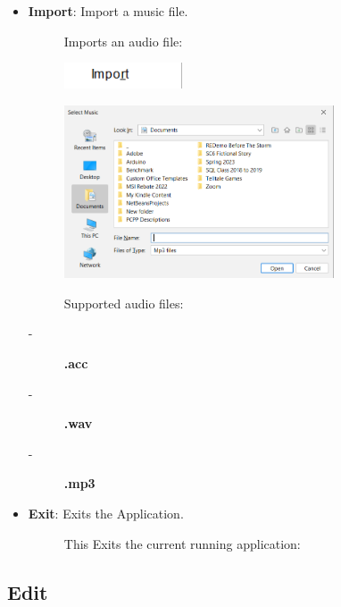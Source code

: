\documentclass{article}
\begin{document}
\begin{itemize}
    \clearpage
    
    \item \textbf{Import}: Import a music file.
    \begin{description}
        \item[] Imports an audio file:
        \item[] \includegraphics[width=3.5cm]{Images/File Import.png}
        \item[] \includegraphics[width=8cm]{Images/musicFileSearch.png}
        \item[]Supported audio files: 
        \item[-]\textbf{.acc}
        \item[-]\textbf{.wav}
        \item[-]\textbf{.mp3}
    \end{description}
        \item \textbf{Exit}: Exits the Application.
    \begin{description}
        \item[] This Exits the current running application:
    \end{description}
\end{itemize}

\subsection{Edit}
\end{document}

